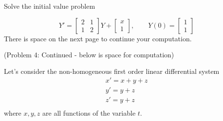 \documentclass[11pt]{exam}
\begin{document}
\begin{questions}

\pagebreak

\addpoints
\question[20]
Solve the initial value problem

$$
Y'=
\begin{bmatrix}
2 & 1 \\
1 & 2 
\end{bmatrix}
Y
+
\begin{bmatrix}
x \\
1
\end{bmatrix},
\quad \quad 
Y(0)=
\begin{bmatrix}
1 \\
1
\end{bmatrix}$$
There is space on the next page to continue your computation.

\newpage 
(Problem 4: Continued - below is space for computation)
\newpage

\addpoints
\question


Let's consider the non-homogeneous first order linear differential system
\begin{equation*}
\begin{array}{l}
       x'=x+y+z\\
       y'=y+z\\
       z'=y+z\\
        \end{array}
\end{equation*}
where $x,y,z$ are all functions of the variable $t$.

\end{questions}
\end{document}
